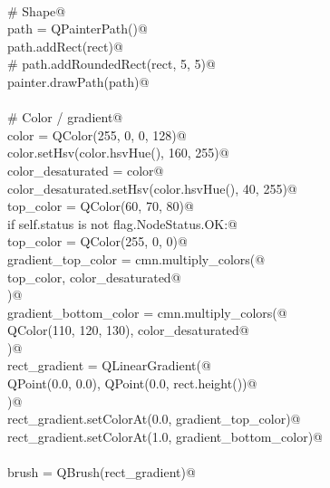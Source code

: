 \documentclass[
    a4paper,      %
    10pt,         %
    openright,    %
    notitlepage,  %
    parskip=half, %
]{scrreprt}       %
\theoremstyle{definition}                    %
\begin{document}
\begin{flushleft}
\begin{minipage}{\linewidth}
\begin{list}{}{}
\mbox{}\lstinline@@\\
\mbox{}\lstinline@    # Shape@\\
\mbox{}\lstinline@    path = QPainterPath()@\\
\mbox{}\lstinline@    path.addRect(rect)@\\
\mbox{}\lstinline@    # path.addRoundedRect(rect, 5, 5)@\\
\mbox{}\lstinline@    painter.drawPath(path)@\\
\mbox{}\lstinline@@\\
\mbox{}\lstinline@    # Color / gradient@\\
\mbox{}\lstinline@    color = QColor(255, 0, 0, 128)@\\
\mbox{}\lstinline@    color.setHsv(color.hsvHue(), 160, 255)@\\
\mbox{}\lstinline@    color_desaturated = color@\\
\mbox{}\lstinline@    color_desaturated.setHsv(color.hsvHue(), 40, 255)@\\
\mbox{}\lstinline@    top_color = QColor(60, 70, 80)@\\
\mbox{}\lstinline@    if self.status is not flag.NodeStatus.OK:@\\
\mbox{}\lstinline@        top_color = QColor(255, 0, 0)@\\
\mbox{}\lstinline@    gradient_top_color = cmn.multiply_colors(@\\
\mbox{}\lstinline@        top_color, color_desaturated@\\
\mbox{}\lstinline@    )@\\
\mbox{}\lstinline@    gradient_bottom_color = cmn.multiply_colors(@\\
\mbox{}\lstinline@        QColor(110, 120, 130), color_desaturated@\\
\mbox{}\lstinline@    )@\\
\mbox{}\lstinline@    rect_gradient = QLinearGradient(@\\
\mbox{}\lstinline@        QPoint(0.0, 0.0), QPoint(0.0, rect.height())@\\
\mbox{}\lstinline@    )@\\
\mbox{}\lstinline@    rect_gradient.setColorAt(0.0, gradient_top_color)@\\
\mbox{}\lstinline@    rect_gradient.setColorAt(1.0, gradient_bottom_color)@\\
\mbox{}\lstinline@@\\
\mbox{}\lstinline@    brush = QBrush(rect_gradient)@\\
\mbox{}\lstinline@@\\

\end{list}
\end{minipage}
\end{flushleft}
\end{document}
